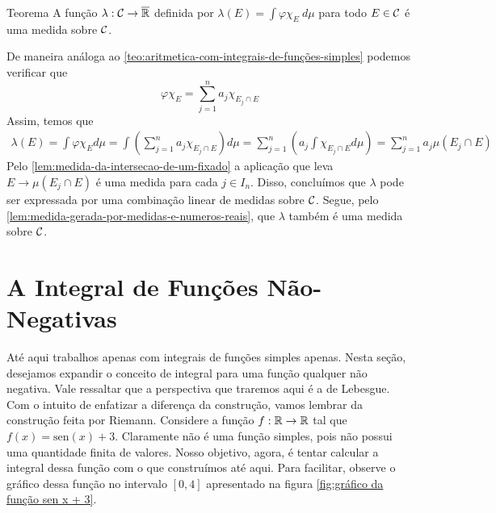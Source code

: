 \begin{env}{Teorema}
	\label{teo:medida-atraves-de-uma-integral}
	A função $\lambda: \operatorname{\mathcal{C}} \to \operatorname{\overline{\mathbb{R}}}$ definida por
	$
	\displaystyle\lambda(E) = \int \varphi\chi_E\ d\mu
	$
	para todo $E \in \operatorname{\mathcal{C}}$ é uma medida sobre $\operatorname{\mathcal{C}}$. 
\end{env}

\begin{prova}
	De maneira análoga ao  \ref{teo:aritmetica-com-integrais-de-funções-simples}
	podemos verificar que 
	$$
	\varphi\chi_E = \sum_{j = 1}^n a_j\chi_{E_j \cap E}
	$$
	Assim, temos que 
	\begin{align*}
		\lambda(E) 
		= \int \varphi\chi_E d\mu
		= \int\left(\sum_{j = 1}^n a_j\chi_{E_j \cap E}\right)d\mu
		= \sum_{j = 1}^n\left(a_j\int \chi_{E_j \cap E}d\mu\right) 
		= \sum_{j = 1}^n a_j\mu(E_j\cap E)
	\end{align*}
	Pelo  \ref{lem:medida-da-intersecao-de-um-fixado} a aplicação que leva 
	$E \to \mu(E_j\cap E)$ é uma medida para cada $j \in I_n$.
	Disso, concluímos que $\lambda$ pode ser expressada por uma combinação linear de medidas sobre $\operatorname{\mathcal{C}}$.
	Segue, pelo  \ref{lem:medida-gerada-por-medidas-e-numeros-reais}, que 
	$\lambda$ também é uma medida sobre $\operatorname{\mathcal{C}}$.
\end{prova}

\section{A Integral de Funções Não-Negativas}

Até aqui trabalhos apenas com integrais de funções simples apenas.
Nesta seção, desejamos expandir o conceito de integral para uma função qualquer não negativa.
Vale ressaltar que a perspectiva que traremos aqui é a de Lebesgue.
Com o intuito de enfatizar a diferença da construção, vamos lembrar da construção feita por Riemann.
Considere a função $f: \mathbb{R} \to \mathbb{R}$ tal que $f(x) = \mathrm{sen}(x) + 3$.
Claramente não é uma função simples, pois não possui uma quantidade finita de valores. 
Nosso objetivo, agora, é tentar calcular a integral dessa função com o que construímos até aqui.
Para facilitar, observe o gráfico dessa função no intervalo $[0,4]$ apresentado na figura \ref{fig:gráfico da função sen x + 3}.


